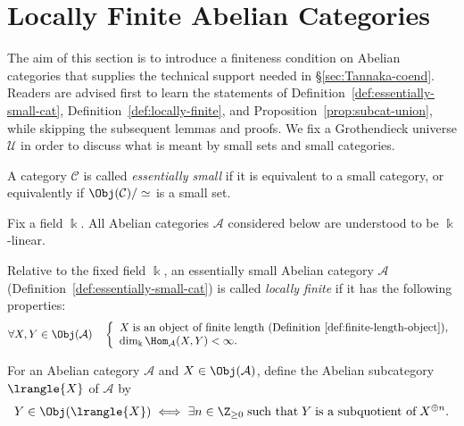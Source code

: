 \section{Locally Finite Abelian Categories}\label{sec:locally-finite-Abel-cat}
The aim of this section is to introduce a finiteness condition on Abelian categories that supplies the technical support needed in \S\ref{sec:Tannaka-coend}. Readers are advised first to learn the statements of Definition~\ref{def:essentially-small-cat}, Definition~\ref{def:locally-finite}, and Proposition~\ref{prop:subcat-union}, while skipping the subsequent lemmas and proofs. We fix a Grothendieck universe $\mathcal{U}$ in order to discuss what is meant by small sets and small categories.

\begin{definition}\label{def:essentially-small-cat}
	A category $\mathcal{C}$ is called \emph{essentially small} if it is equivalent to a small category, or equivalently if $\Obj(\mathcal{C})/\simeq$ is a small set.
\end{definition}

Fix a field $\Bbbk$. All Abelian categories $\mathcal{A}$ considered below are understood to be $\Bbbk$-linear.

\begin{definition}\label{def:locally-finite}
	Relative to the fixed field $\Bbbk$, an essentially small Abelian category $\mathcal{A}$ (Definition~\ref{def:essentially-small-cat}) is called \emph{locally finite} if it has the following properties:
	\begin{equation*}
		\forall X, Y \in \Obj(\mathcal{A}) \quad
		\left\{\begin{array}{l}
			X\; \text{is an object of finite length (Definition \ref{def:finite-length-object})}, \\
			\dim_{\Bbbk} \Hom_{\mathcal{A}}(X, Y) < \infty.
		\end{array}\right.
	\end{equation*}
\end{definition}

\begin{convention}
	For an Abelian category $\mathcal{A}$ and $X\in\Obj(\mathcal{A})$, define the Abelian subcategory $\lrangle{X}$ of $\mathcal{A}$ by
	\[ Y \in \Obj(\lrangle{X}) \iff \exists n \in \Z_{\geq 0} \; \text{such that}\; Y \;\text{is a subquotient of}\; X^{\oplus n}. \]
\end{convention}

